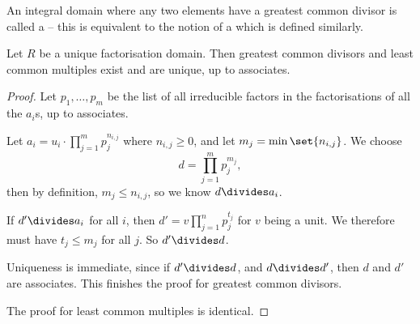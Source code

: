 An integral domain where any two elements have a greatest common divisor is called a  -- this is equivalent to the notion of a  which is defined similarly.

\begin{theorem}
    \label{thm:ufd-gcd}%
    Let \(R\) be a unique factorisation domain. Then greatest common divisors and least common multiples exist and are unique, up to associates.    
\end{theorem}

\begin{proof}
    Let \(p_1, \ldots, p_m\) be the list of all irreducible factors in the factorisations of all the \(a_i\)s, up to associates.

    Let \(a_i = u_i \cdot \prod_{j = 1}^{m} p_j^{n_{i, j}}\) where \(n_{i, j} \geq 0\), and let \(m_j = \min \set{n_{i, j}}\). We choose
    \[
        d = \prod_{j = 1}^{m} p_j^{m_j},
    \]
    then by definition, \(m_j \leq n_{i, j}\), so we know \(d \divides a_i\).

    If \(d' \divides a_i\) for all \(i\), then \(d' = v \prod_{j = 1}^{n} p_j^{t_j}\) for \(v\) being a unit. We therefore must have \(t_j \leq m_j\) for all \(j\). So \(d' \divides d\).

    Uniqueness is immediate, since if \(d' \divides d\), and \(d \divides d'\), then \(d\) and \(d'\) are associates. This finishes the proof for greatest common divisors.

    The proof for least common multiples is identical.
\end{proof}